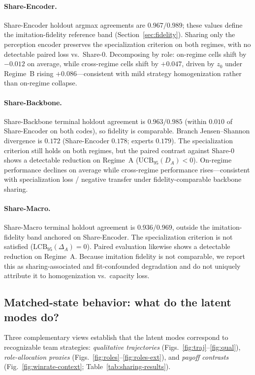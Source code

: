 \documentclass{article}
\begin{document}
\paragraph{Share-Encoder.}
Share-Encoder holdout argmax agreements are $0.967/0.989$; these values define
the imitation-fidelity reference band
(Section~\ref{sec:fidelity}).
Sharing only the perception encoder preserves the specialization criterion on
both regimes, with no detectable paired loss vs.\ Share-0.
Decomposing by role: on-regime cells shift by $-0.012$ on average, while
cross-regime cells shift by $+0.047$, driven by $z_0$ under Regime~B rising
$+0.086$---consistent with mild strategy homogenization rather than on-regime
collapse.

\paragraph{Share-Backbone.}
Share-Backbone terminal holdout agreement is $0.963/0.985$ (within $0.010$ of
Share-Encoder on both codes), so fidelity is comparable.
Branch Jensen--Shannon divergence is $0.172$ (Share-Encoder $0.178$; experts
$0.179$). The specialization criterion still holds on both regimes, but the
paired contrast against Share-0 shows a detectable reduction on Regime~A
($\mathrm{UCB}_{95}(D_A)<0$). On-regime performance declines on average while
cross-regime performance rises---consistent with specialization loss / negative
transfer under fidelity-comparable backbone sharing.

\paragraph{Share-Macro.}
Share-Macro terminal holdout agreement is $0.936/0.969$, outside the
imitation-fidelity band anchored on Share-Encoder. The specialization criterion
is not satisfied ($\mathrm{LCB}_{95}(\Delta_A)=0$). Paired evaluation likewise
shows a detectable reduction on Regime~A. Because imitation fidelity is not
comparable, we report this as sharing-associated and fit-confounded degradation
and do not uniquely attribute it to homogenization vs.\ capacity loss.

\subsection{Matched-state behavior: what do the latent modes do?}

Three complementary views establish that the latent modes correspond to
recognizable team strategies: \emph{qualitative trajectories}
(Figs.~\ref{fig:traj}--\ref{fig:qual}), \emph{role-allocation proxies}
(Figs.~\ref{fig:roles}--\ref{fig:roles-ext}), and \emph{payoff contrasts}
(Fig.~\ref{fig:winrate-context}; Table~\ref{tab:sharing-results}).
\end{document}
